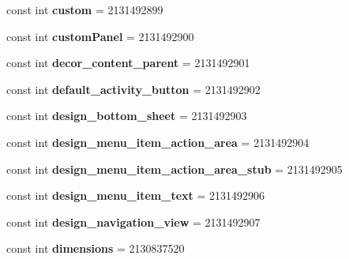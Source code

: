 \begin{DoxyCompactItemize}
const int {\bfseries custom} = 2131492899
\item 
\mbox{\label{classst_delivery_1_1_resource_1_1_id_aa6206fdc9adb175c1be83d79e75b50c2}} 
const int {\bfseries custom\+Panel} = 2131492900
\item 
\mbox{\label{classst_delivery_1_1_resource_1_1_id_ab61a73891d48e0ca612c478541247619}} 
const int {\bfseries decor\+\_\+content\+\_\+parent} = 2131492901
\item 
\mbox{\label{classst_delivery_1_1_resource_1_1_id_a6f6870935d5c389d2691f0feb937d496}} 
const int {\bfseries default\+\_\+activity\+\_\+button} = 2131492902
\item 
\mbox{\label{classst_delivery_1_1_resource_1_1_id_a5b07b349dfc022822b527b455a64eb89}} 
const int {\bfseries design\+\_\+bottom\+\_\+sheet} = 2131492903
\item 
\mbox{\label{classst_delivery_1_1_resource_1_1_id_aaba0400f8ed5ce0d280d289c739ad04c}} 
const int {\bfseries design\+\_\+menu\+\_\+item\+\_\+action\+\_\+area} = 2131492904
\item 
\mbox{\label{classst_delivery_1_1_resource_1_1_id_a03bb6afd1ca9e5c44fcfcc4ed401e314}} 
const int {\bfseries design\+\_\+menu\+\_\+item\+\_\+action\+\_\+area\+\_\+stub} = 2131492905
\item 
\mbox{\label{classst_delivery_1_1_resource_1_1_id_aa59fabb9b09e0dc5ebc664028bad298d}} 
const int {\bfseries design\+\_\+menu\+\_\+item\+\_\+text} = 2131492906
\item 
\mbox{\label{classst_delivery_1_1_resource_1_1_id_a4a01346b65510a32fb4b2233c8669eb2}} 
const int {\bfseries design\+\_\+navigation\+\_\+view} = 2131492907
\item 
\mbox{\label{classst_delivery_1_1_resource_1_1_id_ab48bbc29983caec9d8e0bd6061ff95b1}} 
const int {\bfseries dimensions} = 2130837520

\end{DoxyCompactItemize}
